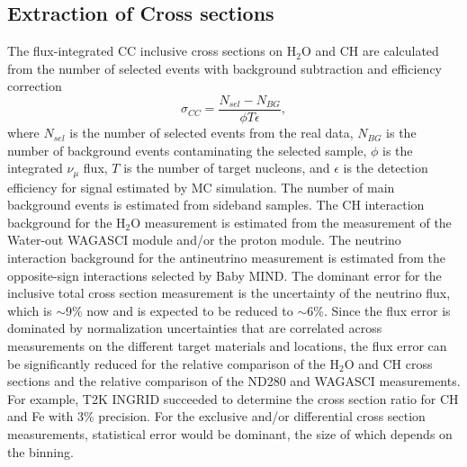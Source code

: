 \subsection{Extraction of Cross sections}
The flux-integrated CC inclusive cross sections on $\mathrm{H_2O}$ and CH are calculated from the number of selected events
with background subtraction and efficiency correction
\begin{equation*}
\sigma_{CC} = \frac{N_{sel}-N_{BG}}{\phi T \epsilon},
\end{equation*}
where $N_{sel}$ is the number of selected events from the real data,
$N_{BG}$ 
is the number of background events contaminating the selected sample,
$\phi$ is the integrated $\nu_{\mu}$ flux, $T$ is the number of target nucleons,
and $\epsilon$ is the detection efficiency for signal estimated by MC simulation.
The number of main background events 
is estimated from sideband samples.
The CH interaction background for the $\mathrm{H_2O}$ measurement is estimated from the measurement of the Water-out WAGASCI module and/or
the proton module.
The neutrino interaction background for the antineutrino measurement is estimated from the opposite-sign interactions selected by Baby MIND.
The dominant error for the inclusive total cross section measurement is the uncertainty of the neutrino flux, which is $\sim$9\% now and is expected to be reduced to $\sim$6\%.
Since the flux error is dominated by normalization uncertainties that are correlated across measurements on the different target materials and locations,
the flux error can be significantly reduced for the relative comparison of the $\mathrm{H_2O}$ and CH cross sections
and the relative comparison of the ND280 and WAGASCI measurements.
For example, T2K INGRID succeeded to determine the cross section ratio for CH and Fe with 3\% precision\cite{ingrid_ccinclusive}.
For the exclusive and/or differential 
cross section measurements,
statistical error would be dominant, 
the size of which depends on the binning.

